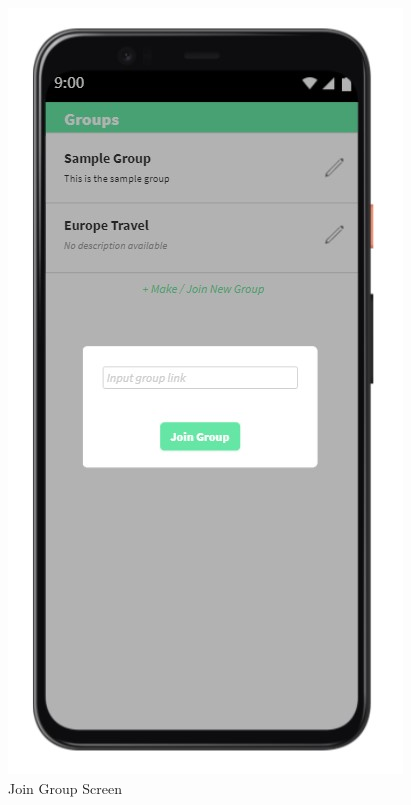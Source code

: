 \documentclass[conference]{IEEEtran}
\begin{document}
\begin{enumerate}
\begin{figure}[H]
                \centerline{\includegraphics[scale=0.5]{img/ui/group-join.jpg}}
                \caption{Join Group Screen}
                \label{fig:join-group-screen}
            \end{figure}
            \begin{figure}[H]

\end{figure}
\end{enumerate}
\end{document}
